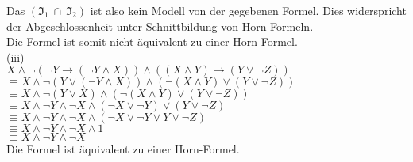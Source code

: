 \documentclass[11pt, a4paper]{article}
\begin{document}
\begin{adjustwidth}{20pt}{20pt}
\noindent Das $(\mathfrak{I_1}\ \cap\ \mathfrak{I_2})$ ist also kein Modell von der gegebenen Formel. Dies widerspricht der Abgeschlossenheit unter Schnittbildung von Horn-Formeln.\\
Die Formel ist somit nicht äquivalent zu einer Horn-Formel.\\
(iii)\\
$X \wedge \neg ( \neg Y \rightarrow (\neg Y \wedge X)) \wedge ((X \wedge Y)\rightarrow(Y \vee \neg Z))$\\
$\equiv X \wedge \neg ( Y \vee (\neg Y \wedge X)) \wedge (\neg (X \wedge Y)\vee(Y \vee \neg Z))$\\
$\equiv X \wedge \neg ( Y \vee X) \wedge (\neg (X \wedge Y)\vee(Y \vee \neg Z))$\\
$\equiv X \wedge \neg Y \wedge \neg X \wedge (\neg X \vee \neg Y)\vee(Y \vee \neg Z)$\\
$\equiv X \wedge \neg Y \wedge \neg X \wedge (\neg X \vee \neg Y \vee Y \vee \neg Z)$\\
$\equiv X \wedge \neg Y \wedge \neg X \wedge 1$\\
$\equiv X \wedge \neg Y \wedge \neg X$\\

Die Formel ist äquivalent zu einer Horn-Formel.


\end{adjustwidth}
\end{document}
